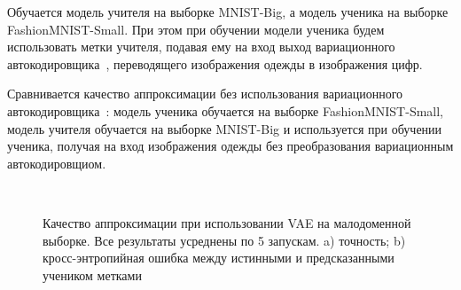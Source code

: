 Обучается модель учителя на выборке MNIST-Big, а модель ученика на выборке FashionMNIST-Small. При этом при обучении модели ученика будем использовать метки учителя, подавая ему на вход выход вариационного автокодировщика~\cite{VAE}, переводящего изображения одежды в изображения цифр.

Сравнивается качество аппроксимации без использования вариационного автокодировщика~\cite{VAE}: модель ученика обучается на выборке FashionMNIST-Small, модель учителя обучается на выборке MNIST-Big и используется при обучении ученика, получая на вход изображения одежды без преобразования вариационным автокодировщиом.\\

\begin{figure}[h!t]\center
{}
\\
\caption{Качество аппроксимации при использовании VAE на малодоменной выборке. Все результаты усреднены по 5 запускам. a) точность; b) кросс-энтропийная ошибка между истинными и предсказанными учеником метками}
\end{figure}\\

